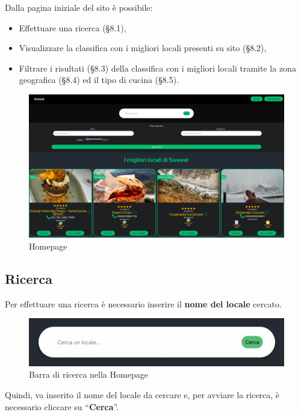 Dalla pagina iniziale del sito è possibile:

\begin{itemize}
\item Effettuare una ricerca (\S{8.1}),
\item Visualizzare la classifica con i migliori locali presenti su sito (\S{8.2}),
\item Filtrare i risultati (\S{8.3}) della classifica con i migliori locali tramite la zona geografica (\S{8.4}) ed il tipo di cucina (\S{8.5}).
\end{itemize}

\begin{figure}[H]
\centering
\includegraphics[scale=0.15]{./images/Homepage/Homepage.png} 
\caption{Homepage}
\end{figure}

\subsection{Ricerca}

Per effettuare una ricerca è necessario inserire il \textbf{nome del locale} cercato.

\begin{figure}[H]
\centering
\includegraphics[scale=0.45]{./images/Homepage/Ricerca.png} 
\caption{Barra di ricerca nella Homepage}
\end{figure}

Quindi, va inserito il nome del locale da cercare e, per avviare la ricerca, è necessario cliccare su “\textbf{Cerca}”.

